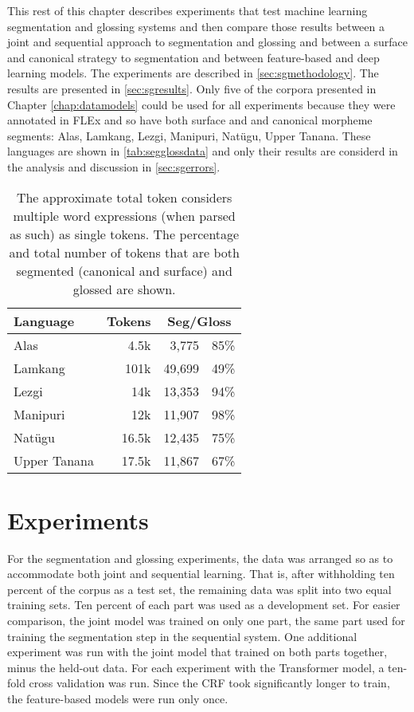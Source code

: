 This rest of this chapter describes experiments that test machine learning segmentation and glossing systems and then compare those results between a joint and sequential approach to segmentation and glossing and between a surface and canonical strategy to segmentation and between feature-based and deep learning models.  The experiments are described in \autoref{sec:sgmethodology}. The results are presented in \autoref{sec:sgresults}. Only five of the corpora presented in Chapter \ref{chap:datamodels} could be used for all experiments because they were annotated in FLEx and so have both surface and and canonical morpheme segments: Alas, Lamkang, Lezgi, Manipuri, Nat\"ugu, Upper Tanana. These languages are shown in \autoref{tab:segglossdata} and only their results are considerd in the analysis and discussion in \autoref{sec:sgerrors}.


\begin{table}[!tb]
    \centering
    \begin{tabular}{l|r|rc}
         \textbf{Language} & \textbf{Tokens} & \multicolumn{2}{c}{\textbf{Seg/Gloss}} \\
         \hline
         Alas & 4.5k & 3,775 & 85\%  \\
         \hline
         Lamkang & 101k & 49,699 & 49\% \\
         \hline
         Lezgi & 14k & 13,353  & 94\% \\
         \hline
         Manipuri & 12k & 11,907 & 98\% \\
         \hline
         Natügu & 16.5k & 12,435 & 75\%  \\
         \hline
         Upper Tanana & 17.5k & 11,867 & 67\% 
    \end{tabular}
    \caption[Data for Segmentation and Glossing Experimentation]{The approximate total token considers multiple word expressions (when parsed as such) as single tokens. The percentage and total number of tokens that are both segmented (canonical and surface) and glossed are shown.}
    \label{tab:segglossdata}
\end{table}




\section{Experiments}
\label{sec:sgmethodology}

For the segmentation and glossing experiments, the data was arranged so as to accommodate both joint and sequential learning. That is, after withholding ten percent of the corpus as a test set, the remaining data was split into two equal training sets.  Ten percent of each part was used as a development set. For easier comparison, the joint model was trained on only one part, the same part used for training the segmentation step in the sequential system. One additional experiment was run with the joint model that trained on both parts together, minus the held-out data. For each experiment with the Transformer model, a ten-fold cross validation was run. Since the CRF took significantly longer to train, the feature-based models were run only once.


